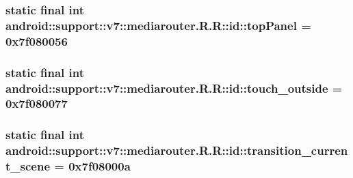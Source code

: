 \hypertarget{classandroid_1_1support_1_1v7_1_1mediarouter_1_1_r_1_1id_c9cfd910444ac5173d787c346b60468c}{
\subsubsection[{topPanel}]{\setlength{\rightskip}{0pt plus 5cm}static final int android::support::v7::mediarouter.R.R::id::topPanel = 0x7f080056}}
\label{classandroid_1_1support_1_1v7_1_1mediarouter_1_1_r_1_1id_c9cfd910444ac5173d787c346b60468c}


\hypertarget{classandroid_1_1support_1_1v7_1_1mediarouter_1_1_r_1_1id_6e95e950f3045b39ecd7741919eb1ef4}{
\subsubsection[{touch\_\-outside}]{\setlength{\rightskip}{0pt plus 5cm}static final int android::support::v7::mediarouter.R.R::id::touch\_\-outside = 0x7f080077}}
\label{classandroid_1_1support_1_1v7_1_1mediarouter_1_1_r_1_1id_6e95e950f3045b39ecd7741919eb1ef4}


\hypertarget{classandroid_1_1support_1_1v7_1_1mediarouter_1_1_r_1_1id_6379454477b25086b5ca2d933321a550}{
\subsubsection[{transition\_\-current\_\-scene}]{\setlength{\rightskip}{0pt plus 5cm}static final int android::support::v7::mediarouter.R.R::id::transition\_\-current\_\-scene = 0x7f08000a}}
\label{classandroid_1_1support_1_1v7_1_1mediarouter_1_1_r_1_1id_6379454477b25086b5ca2d933321a550}


